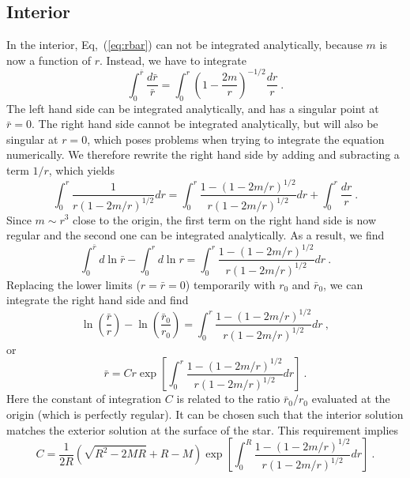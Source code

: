 \subsection{Interior}
\label{sbsc:interior}

In the interior, Eq,~(\ref{eq:rbar}) can not be integrated analytically, because
$m$ is now a function of $r$. Instead, we have to integrate
\begin{equation}
\int_0^{\bar{r}} \dfrac{d\bar{r}}{\bar{r}} = \int_0^r\left(1-\dfrac{2m}{r}\right)^{-1/2}\dfrac{dr}{r} \ .
\end{equation}
The left hand side can be integrated analytically, and has a singular point at
$\bar{r}=0$. The right hand side cannot be integrated analytically, but will also
be singular at $r=0$, which poses problems when trying to integrate the equation
numerically. We therefore rewrite the right hand side by adding and subracting
a term $1/r$, which yields
\begin{equation}
\int_0^r\dfrac{1}{r(1-2m/r)^{1/2}}dr = \int_0^r\dfrac{1-(1-2m/r)^{1/2}}{r(1-2m/r)^{1/2}}dr+\int_0^r\dfrac{dr}{r} \ .
\end{equation}
Since $m\sim r^3$ close to the origin, the first term on the right hand side is now
regular and the second one can be integrated analytically. As a result, we find
\begin{equation}
\int_0^{\bar{r}}d\ln\bar{r}-\int_0^rd\ln r=\int_0^r\dfrac{1-(1-2m/r)^{1/2}}{r(1-2m/r)^{1/2}}dr \ .
\end{equation}
Replacing the lower limits ($r=\bar{r}=0$) temporarily with $r_0$ and $\bar{r}_0$, we can integrate
the right hand side and find
\begin{equation}
\ln\left(\dfrac{\bar{r}}{r}\right)-\ln\left(\dfrac{\bar{r}_0}{r_0}\right)=\int_0^r\dfrac{1-(1-2m/r)^{1/2}}{r(1-2m/r)^{1/2}}dr \ ,
\end{equation}
or
\begin{equation}
\bar{r} = C r \exp\left[\int_0^r\dfrac{1-(1-2m/r)^{1/2}}{r(1-2m/r)^{1/2}}dr\right] \ .
\end{equation}
Here the constant of integration $C$ is related to the ratio $\bar{r}_0/r_0$ evaluated at
the origin (which is perfectly regular). It can be chosen such that the interior solution
matches the exterior solution at the surface of the star. This requirement implies
\begin{equation}
C = \dfrac{1}{2R}\left(\sqrt{R^2-2MR}+R-M\right)\exp\left[\int_0^R\dfrac{1-(1-2m/r)^{1/2}}{r(1-2m/r)^{1/2}}dr\right] \ .
\end{equation}
